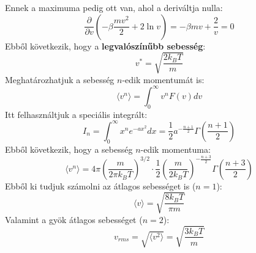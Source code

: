 \documentclass[../main.tex]{subfiles}
\begin{document}
Ennek a maximuma pedig ott van, ahol a deriváltja nulla:
\begin{equation}
    \frac{\partial}{\partial v} \left( - \beta \frac{m v^2}{2} + 2 \ln v \right) = - \beta m v + \frac{2}{v} = 0
\end{equation}
Ebből következik, hogy a \textbf{legvalószínűbb sebesség}:
\begin{equation}
    v^{*} = \sqrt{\frac{2 k_B T}{m}}
\end{equation}
Meghatározhatjuk a sebesség $n$-edik momentumát is:
\begin{equation}
    \langle v^n \rangle = \int_0^{\infty} v^n F(v) dv
\end{equation}
Itt felhasználtjuk a speciális integrált:
\begin{equation}
    I_n = \int_0^{\infty} x^n e^{-a x^2} dx = \frac{1}{2} a^{-\frac{n+1}{2}} \Gamma \left( \frac{n+1}{2} \right)
\end{equation}
Ebből következik, hogy a sebesség $n$-edik momentuma:
\begin{equation}
    \langle v^n \rangle = 4 \pi \left( \frac{m}{2 \pi k_B T} \right)^{3/2} \cdot \frac{1}{2} \left( \frac{m}{2 k_B T} \right)^{-\frac{n+3}{2}} \Gamma \left(\frac{n+3}{2} \right)
\end{equation}
Ebből ki tudjuk számolni az átlagos sebességet is ($n = 1$):
\begin{equation}
    \langle v \rangle = \sqrt{\frac{8 k_B T}{\pi m}}
\end{equation}
Valamint a gyök átlagos sebességet ($n = 2$):
\begin{equation}
    v_{rms} = \sqrt{\langle v^2 \rangle} = \sqrt{\frac{3 k_B T}{m}}
\end{equation}
\end{document}
